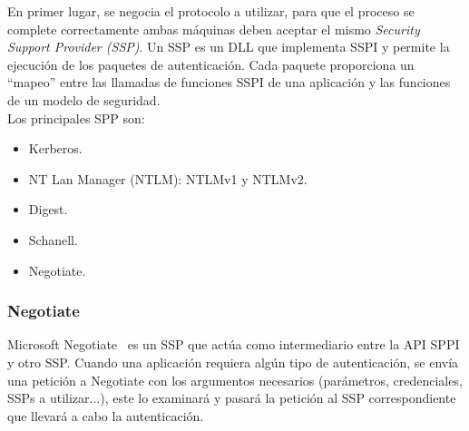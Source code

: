 En primer lugar, se negocia el protocolo a utilizar, para que el proceso se complete correctamente ambas máquinas deben aceptar el mismo {\it Security Support Provider (SSP)}. Un SSP es un DLL que implementa SSPI y permite la ejecución de los paquetes de autenticación. Cada paquete proporciona un ``mapeo'' entre las llamadas de funciones SSPI de una aplicación y las funciones de un modelo de seguridad.\\

Los principales SPP son: 

\begin{itemize}

\item Kerberos.
\begin{listing}[style=consola, numbers=none]
\end{listing}

\item NT Lan Manager (NTLM): NTLMv1 y NTLMv2.
\begin{listing}[style=consola, numbers=none]
\end{listing}

\item Digest.
\begin{listing}[style=consola, numbers=none]
\end{listing}

\item Schanell.
\begin{listing}[style=consola, numbers=none]
\end{listing}

\item Negotiate.
\begin{listing}[style=consola, numbers=none]
\end{listing}

\end{itemize}

\subsubsection{Negotiate}

Microsoft Negotiate~\cite{Capitulo2:Negotiate} es un SSP que actúa como intermediario entre la API SPPI y otro SSP. Cuando una aplicación requiera algún tipo de autenticación, se envía una petición a Negotiate con los argumentos necesarios (parámetros, credenciales, SSPs a utilizar...), este lo examinará y pasará la petición al SSP correspondiente que llevará a cabo la autenticación. \\

